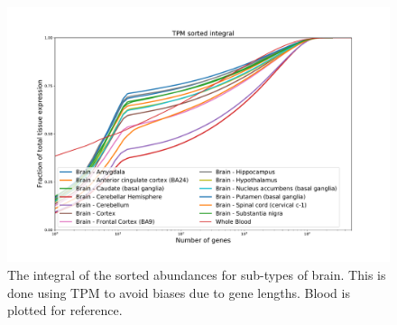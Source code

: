 \begin{figure}[htb!]
  \centering
  \includegraphics[width=0.7\linewidth]{pictures/structure/gtex/fraction_of_trascriptome_Brain.pdf}
  \caption{The integral of the sorted abundances for sub-types of brain. This is done using TPM to avoid biases due to gene lengths. Blood is plotted for reference.}
  \label{fig:structure/gtex/fraction_of_trascriptome_Brain}
\end{figure}


